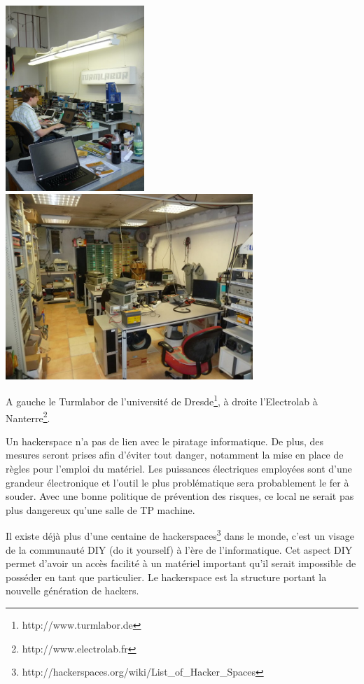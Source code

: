\documentclass{article}
\begin{document}
\begin{center}
\includegraphics[height=70mm]{turmlabor.jpg}
\includegraphics[height=70mm]{electrolab.jpg}

A gauche le Turmlabor de l'université de Dresde\footnote{http://www.turmlabor.de}, à droite l'Electrolab à Nanterre\footnote{http://www.electrolab.fr}.
\end{center}

Un hackerspace n'a pas de lien avec le piratage informatique.
De plus, des mesures seront prises afin d'éviter tout danger, notamment la mise en place de règles pour l'emploi du matériel. Les puissances électriques employées sont d'une grandeur électronique et l'outil le plus problématique sera probablement le fer à souder. Avec une bonne politique de prévention des risques, ce local ne serait pas plus dangereux qu'une salle de TP machine.

Il existe déjà plus d'une centaine de hackerspaces\footnote{http://hackerspaces.org/wiki/List\_of\_Hacker\_Spaces} dans le monde, c'est un visage de la communauté DIY (do it yourself) à l'ère de
l'informatique. Cet aspect DIY permet d'avoir un accès facilité à un
matériel important qu'il serait impossible de posséder en tant que
particulier. Le hackerspace est la structure portant la nouvelle génération de hackers.
\end{document}
